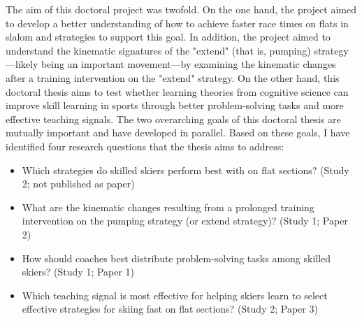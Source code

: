 The aim of this doctoral project was twofold. On the one hand, the project aimed to develop a better understanding of how to achieve faster race times on flats in slalom and strategies to support this goal. In addition, the project aimed to understand the kinematic signatures of the "extend" (that is, pumping) strategy—likely being an important movement—by examining the kinematic changes after a training intervention on the "extend" strategy. On the other hand, this doctoral thesis aims to test whether learning theories from cognitive science can improve skill learning in sports through better problem-solving tasks and more effective teaching signals. The two overarching goals of this doctoral thesis are mutually important and have developed in parallel. Based on these goals, I have identified four research questions that the thesis aims to address:

\begin{itemize}
    \item Which strategies do skilled skiers perform best with on flat sections? (Study 2; not published as paper) 
    \item What are the kinematic changes resulting from a prolonged training intervention on the pumping strategy (or extend strategy)? (Study 1; Paper 2)
    \item How should coaches best distribute problem-solving tasks among skilled skiers? (Study 1; Paper 1)
    \item Which teaching signal is most effective for helping skiers learn to select effective strategies for skiing fast on flat sections?  (Study 2; Paper 3)
\end{itemize}









